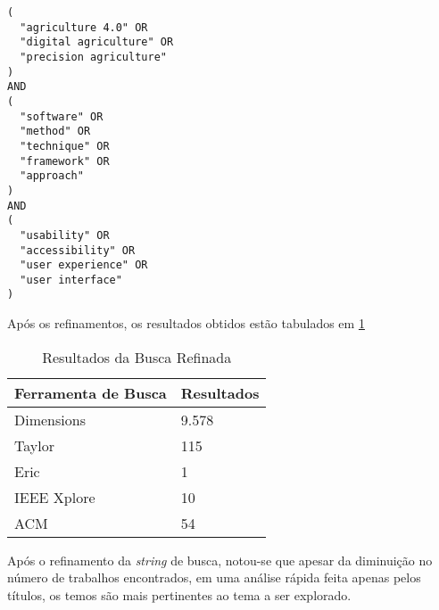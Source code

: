 \documentclass[12pt]{article}
\begin{document}
\begin{lstlisting}[caption={String de Busca Gerada},captionpos=b,frame=single,label={code:string_de_busca_refinada}]
(
  "agriculture 4.0" OR
  "digital agriculture" OR 
  "precision agriculture"
)
AND
(
  "software" OR
  "method" OR
  "technique" OR
  "framework" OR
  "approach"
)
AND
(
  "usability" OR
  "accessibility" OR
  "user experience" OR
  "user interface"
)
\end{lstlisting}

Após os refinamentos, os resultados obtidos estão tabulados em \ref{tab:resultados_busca_refinada}

\begin{table}[!htb]
  \centering
	\begin{tabular}{|l|l|}
		\hline
		\textbf{Ferramenta de Busca} & \textbf{Resultados} \\ \hline
		Dimensions                   & 9.578               \\ \hline
		Taylor                       & 115                 \\ \hline
		Eric                         & 1                   \\ \hline
		IEEE Xplore                  & 10                  \\ \hline
		ACM                          & 54                  \\ \hline
		\end{tabular}
  \caption{Resultados da Busca Refinada}
  \label{tab:resultados_busca_refinada}
\end{table}

Após o refinamento da \textit{string} de busca, notou-se que apesar da diminuição no número de trabalhos encontrados, em uma análise rápida feita apenas pelos títulos, os temos são mais pertinentes ao tema a ser explorado.

% 
% 
\end{document}
